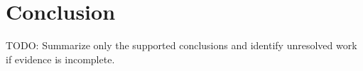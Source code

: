 \section{Conclusion}

TODO: Summarize only the supported conclusions and identify unresolved work if evidence is incomplete.
